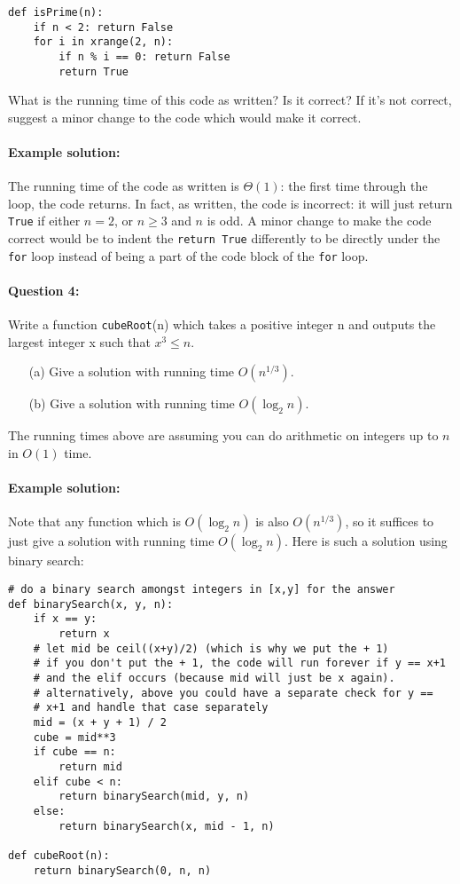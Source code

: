 \documentclass[11pt]{article}
\begin{document}
\begin{verbatim}
def isPrime(n):
    if n < 2: return False
    for i in xrange(2, n):
        if n % i == 0: return False
        return True
\end{verbatim}

What is the running time of this code as written?  Is it correct?  If
it's not correct, suggest a minor change to the code which would make
it correct.

\paragraph{Example solution:}
The running time of the code as written is $\Theta(1)$: the first time
through the loop, the code returns.  In fact, as written, the code is
incorrect: it will just return \texttt{True} if either $n=2$, or $n\ge
3$ and $n$ is odd.  A minor change to make the code correct would be
to indent the \texttt{return True} differently to be directly under
the \texttt{for} loop instead of being a part of the code block of the
\texttt{for} loop.

\paragraph{Question 4:}
Write a function \texttt{cubeRoot}(n) which takes a positive integer n
and outputs the largest integer x such that $x^3 \le n$.

\begin{itemize}
\item[(a)] Give a solution with running time $O(n^{1/3})$.
\item[(b)] Give a solution with running time $O(\log_2 n)$.
\end{itemize}

The running times above are assuming you can do arithmetic on integers
up to $n$ in $O(1)$ time.

\paragraph{Example solution:}
Note that any function which is $O(\log_2 n)$ is also $O(n^{1/3})$, so it
suffices to just give a solution with running time $O(\log_2 n)$.
Here is such a solution using binary search:

\begin{verbatim}
# do a binary search amongst integers in [x,y] for the answer
def binarySearch(x, y, n):
    if x == y:
        return x
    # let mid be ceil((x+y)/2) (which is why we put the + 1)
    # if you don't put the + 1, the code will run forever if y == x+1
    # and the elif occurs (because mid will just be x again).
    # alternatively, above you could have a separate check for y ==
    # x+1 and handle that case separately
    mid = (x + y + 1) / 2
    cube = mid**3
    if cube == n:
        return mid
    elif cube < n:
        return binarySearch(mid, y, n)
    else:
        return binarySearch(x, mid - 1, n)

def cubeRoot(n):
    return binarySearch(0, n, n)
\end{verbatim}
\end{document}
